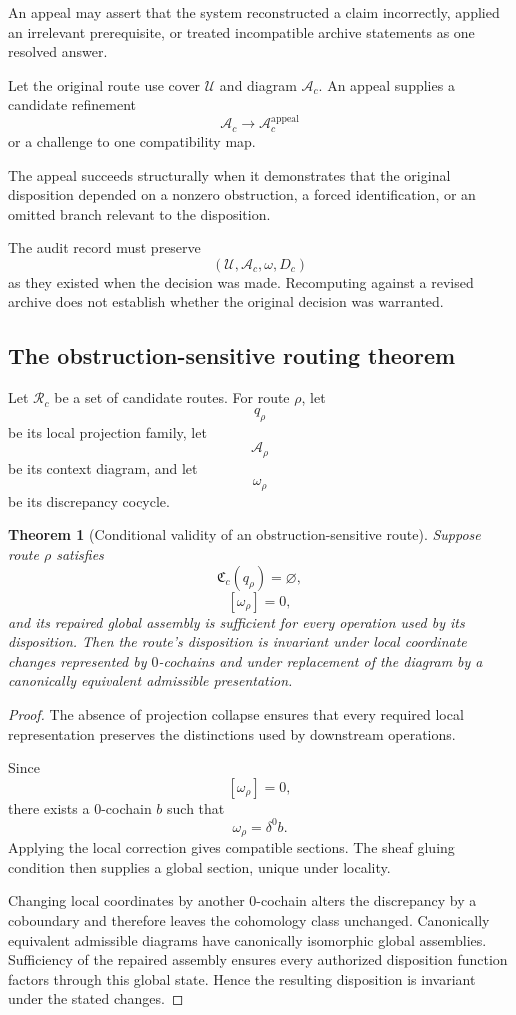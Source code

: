 \documentclass[11pt]{article}
\newtheorem{theorem}[definition]{Theorem}
\theoremstyle{definition}
\newcommand{\A}{\mathcal{A}}
\begin{document}
An appeal may assert that the system reconstructed a claim incorrectly, applied an irrelevant prerequisite, or treated incompatible archive statements as one resolved answer.

Let the original route use cover \(\mathcal U\) and diagram \(\A_c\). An appeal supplies a candidate refinement
\[
\A_c\to\A_c^{\mathrm{appeal}}
\]
or a challenge to one compatibility map.

The appeal succeeds structurally when it demonstrates that the original disposition depended on a nonzero obstruction, a forced identification, or an omitted branch relevant to the disposition.

The audit record must preserve
\[
(\mathcal U,\A_c,\omega,D_c)
\]
as they existed when the decision was made. Recomputing against a revised archive does not establish whether the original decision was warranted.

\subsection{The obstruction-sensitive routing theorem}

Let \(\mathcal R_c\) be a set of candidate routes. For route \(\rho\), let
\[
q_\rho
\]
be its local projection family, let
\[
\A_\rho
\]
be its context diagram, and let
\[
\omega_\rho
\]
be its discrepancy cocycle.

\begin{theorem}[Conditional validity of an obstruction-sensitive route]
Suppose route \(\rho\) satisfies
\[
\mathfrak C_c(q_\rho)=\varnothing,
\]
\[
[\omega_\rho]=0,
\]
and its repaired global assembly is sufficient for every operation used by its disposition. Then the route's disposition is invariant under local coordinate changes represented by \(0\)-cochains and under replacement of the diagram by a canonically equivalent admissible presentation.
\end{theorem}

\begin{proof}
The absence of projection collapse ensures that every required local representation preserves the distinctions used by downstream operations.

Since
\[
[\omega_\rho]=0,
\]
there exists a \(0\)-cochain \(b\) such that
\[
\omega_\rho=\delta^0b.
\]
Applying the local correction gives compatible sections. The sheaf gluing condition then supplies a global section, unique under locality.

Changing local coordinates by another \(0\)-cochain alters the discrepancy by a coboundary and therefore leaves the cohomology class unchanged. Canonically equivalent admissible diagrams have canonically isomorphic global assemblies. Sufficiency of the repaired assembly ensures every authorized disposition function factors through this global state. Hence the resulting disposition is invariant under the stated changes.
\end{proof}
\end{document}
